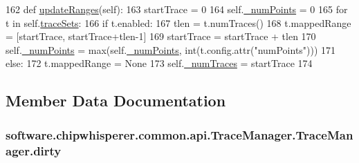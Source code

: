 \begin{DoxyCode}
162     \textcolor{keyword}{def }\hyperlink{classsoftware_1_1chipwhisperer_1_1common_1_1api_1_1TraceManager_1_1TraceManager_a383b58d4494b5898182cf84c27adb6b4}{updateRanges}(self):
163         startTrace = 0
164         self.\hyperlink{classsoftware_1_1chipwhisperer_1_1common_1_1api_1_1TraceManager_1_1TraceManager_a4019b9da06545a95cace5e6e3303bf2c}{\_numPoints} = 0
165         \textcolor{keywordflow}{for} t \textcolor{keywordflow}{in} self.\hyperlink{classsoftware_1_1chipwhisperer_1_1common_1_1api_1_1TraceManager_1_1TraceManager_a12d367c3f8b7e0fe7270a76e676347b7}{traceSets}:
166             \textcolor{keywordflow}{if} t.enabled:
167                 tlen = t.numTraces()
168                 t.mappedRange = [startTrace, startTrace+tlen-1]
169                 startTrace = startTrace + tlen
170                 self.\hyperlink{classsoftware_1_1chipwhisperer_1_1common_1_1api_1_1TraceManager_1_1TraceManager_a4019b9da06545a95cace5e6e3303bf2c}{\_numPoints} = max(self.\hyperlink{classsoftware_1_1chipwhisperer_1_1common_1_1api_1_1TraceManager_1_1TraceManager_a4019b9da06545a95cace5e6e3303bf2c}{\_numPoints}, int(t.config.attr(\textcolor{stringliteral}{"numPoints"})))
171             \textcolor{keywordflow}{else}:
172                 t.mappedRange = \textcolor{keywordtype}{None}
173         self.\hyperlink{classsoftware_1_1chipwhisperer_1_1common_1_1api_1_1TraceManager_1_1TraceManager_abefd6cb81ebb0900f4500f5f2fff8af4}{\_numTraces} = startTrace
174 
\end{DoxyCode}


\subsection{Member Data Documentation}
\hypertarget{classsoftware_1_1chipwhisperer_1_1common_1_1api_1_1TraceManager_1_1TraceManager_a65941d9525db4345be427d0676ccd71e}{}
\subsubsection[{dirty}]{\setlength{\rightskip}{0pt plus 5cm}software.\+chipwhisperer.\+common.\+api.\+Trace\+Manager.\+Trace\+Manager.\+dirty}\label{classsoftware_1_1chipwhisperer_1_1common_1_1api_1_1TraceManager_1_1TraceManager_a65941d9525db4345be427d0676ccd71e}


